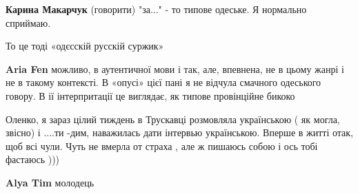 \begin{itemize}
{\begin{itemize}{
 
\textbf{Карина Макарчук} (говорити) "за..." - то типове одеське. Я нормально сприймаю.

 
То це тоді «одєсскій русскій суржик»

 
\textbf{Aria Fen} можливо, в аутентичної мови і так, але, впевнена, не в цьому жанрі і не в такому контексті. В «опусі» цієї пані я не відчула смачного одеського говору. В ії інтерпритації це виглядає, як типове провінційне бикоко
}\end{itemize}

 

Оленко, я зараз цілий тиждень в Трускавці розмовляла українською ( як могла,
звісно) і ....ти -дим, наважилась дати інтервью українською. Вперше в житті
отак, щоб всі чули. Чуть не вмерла от страха , але ж пишаюсь собою і ось тобі
фастаюсь )))

\begin{itemize}{
 
\textbf{Alya Tim} молодець

 
}
\end{itemize}}
\end{itemize}
